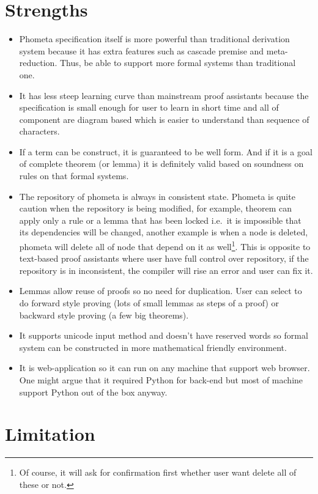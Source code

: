 \documentclass[master.tex]{subfiles}
\begin{document}
\section{Strengths}

\begin{itemize}
\item Phometa specification itself is more powerful than traditional derivation
  system because it has extra features such as cascade premise and
  meta-reduction. Thus, be able to support more formal systems than traditional
  one.
\item It has less steep learning curve than mainstream proof assistants because
  the specification is small enough for user to learn in short time and all of
  component are diagram based which is easier to understand than sequence of
  characters.
\item If a term can be construct, it is guaranteed to be well form. And if it is
  a goal of complete theorem (or lemma) it is definitely valid based on
  soundness on rules on that formal systems.
\item The repository of phometa is always in consistent state. Phometa is quite
  caution when the repository is being modified, for example, theorem can apply
  only a rule or a lemma that has been locked i.e.\ it is impossible that its
  dependencies will be changed, another example is when a node is deleted,
  phometa will delete all of node that depend on it as well\footnote{Of course,
    it will ask for confirmation first whether user want delete all of these or
    not.}. This is opposite to text-based proof assistants where user have full
  control over repository, if the repository is in inconsistent, the compiler
  will rise an error and user can fix it.
\item Lemmas allow reuse of proofs so no need for duplication. User can select
  to do forward style proving (lots of small lemmas as steps of a proof) or
  backward style proving (a few big theorems).
\item It supports unicode input method and doesn't have reserved words so formal
  system can be constructed in more mathematical friendly environment.
\item It is web-application so it can run on any machine that support web
  browser. One might argue that it required Python for back-end but most of
  machine support Python out of the box anyway.
\end{itemize}

\section{Limitation}
\end{document}
